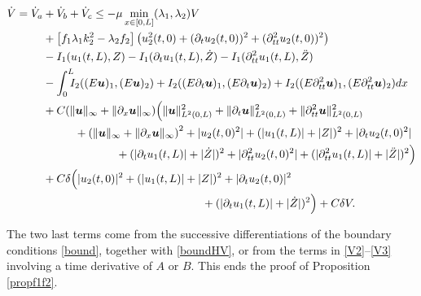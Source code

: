 \begin{align*}
\dot V=\dot V_{a}&+\dot V_{b}+\dot V_{c}\leq-\mu\min\limits_{x\in[0,L]}(\lambda_{1},\lambda_{2})V\\
&+\left[f_{1}\lambda_{1}k_{2}^{2}-\lambda_{2}f_{2}\right]\left(u_{2}^{2}(t,0)+(\partial_{t}u_{2}(t,0))^{2}+(\partial_{tt}^{2}u_{2}(t,0))^{2}\right)\\
&-I_{1}(u_{1}(t,L),Z)-I_{1}(\partial_{t}u_{1}(t,L),\dot Z)-I_{1}(\partial_{tt}^{2}u_{1}(t,L),\ddot Z)\\
&-\int_{0}^{L}\hspace*{-2mm}I_{2}((E\boldsymbol{u})_{1},(E\boldsymbol{u})_{2})+I_{2}((E\partial_{t}\boldsymbol{u})_{1},(E\partial_{t}\boldsymbol{u})_{2})+I_{2}((E\partial_{tt}^{2}\boldsymbol{u})_{1},(E\partial_{tt}^{2}\boldsymbol{u})_{2})dx\\
&+C(\lVert \boldsymbol{u}\rVert_{\infty}+\lVert \partial_{x} \boldsymbol{u}\rVert_{\infty})\Bigl(\lVert\boldsymbol{u} \rVert_{L^{2}(0,L)}^{2}+\lVert\partial_{t}\boldsymbol{u} \rVert_{L^{2}(0,L)}^{2}
+\lVert\partial_{tt}^{2}\boldsymbol{u} \rVert_{L^{2}(0,L)}^{2}\\
&\hspace*{1cm}+\left(\lVert \boldsymbol{u}\rVert_{\infty}+\lVert \partial_{x} \boldsymbol{u}\rVert_{\infty}\right)^{{2}}+|u_{2}(t,0)^{2}|+(|u_{1}(t,L)|+|Z|)^{2}+|\partial_{t}u_{2}(t,0)^{2}|\\
&\hspace*{2.3cm}+(|\partial_{t}u_{1}(t,L)|+|\dot Z|)^{2}+|\partial_{tt}^{2}u_{2}(t,0)^{2}|+(|\partial_{tt}^{2}u_{1}(t,L)|+|\ddot Z|)^{2}\Bigr)\\
&+C\delta\Bigl(|u_{2}(t,0)|^{2}+(|u_{1}(t,L)|+|Z|)^{2}+|\partial_{t}u_{2}(t,0)|^{2}\\
&\hspace*{5cm}+(|\partial_{t}u_{1}(t,L)|+|\dot Z|)^{2}\Bigr)+C\delta V.
\end{align*}

The two last terms come from the successive differentiations of the boundary conditions \eqref{bound}, together with \eqref{boundHV}, or from the terms in \eqref{V2}--\eqref{V3} involving a time derivative of $A$ or $B$. This ends the proof of Proposition \ref{propf1f2}.


